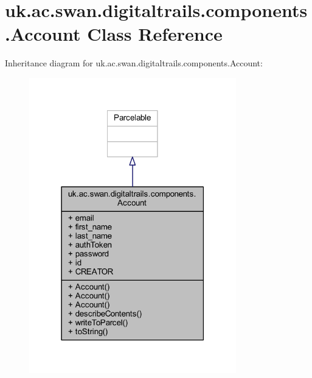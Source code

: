 \hypertarget{classuk_1_1ac_1_1swan_1_1digitaltrails_1_1components_1_1_account}{\section{uk.\+ac.\+swan.\+digitaltrails.\+components.\+Account Class Reference}
\label{classuk_1_1ac_1_1swan_1_1digitaltrails_1_1components_1_1_account}
}


Inheritance diagram for uk.\+ac.\+swan.\+digitaltrails.\+components.\+Account\+:
\nopagebreak
\begin{figure}[H]
\begin{center}
\leavevmode
\includegraphics[width=255pt]{classuk_1_1ac_1_1swan_1_1digitaltrails_1_1components_1_1_account__inherit__graph}
\end{center}
\end{figure}


